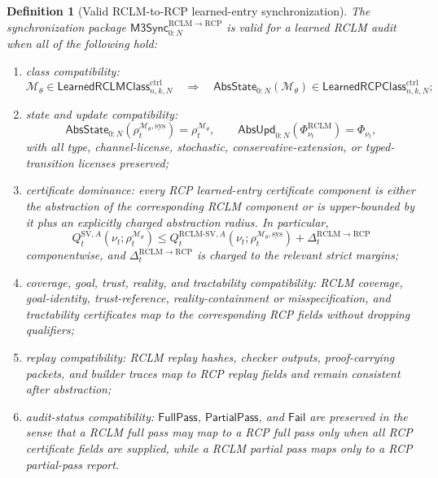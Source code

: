 \documentclass[11pt]{article}
\newtheorem{definition}[theorem]{Definition}
\newcommand{\1}{\mathbf{1}}
\newcommand{\RCP}{\mathrm{RCP}}
\providecommand{\RCLM}{\mathrm{RCLM}}
\providecommand{\sys}{\mathrm{sys}}
\begin{document}
\begin{definition}[Valid RCLM-to-RCP learned-entry synchronization]
\label{def:m3_sync_valid_rclm_to_rcp}
The synchronization package \(\mathsf{M3Sync}_{0:N}^{\RCLM\to\RCP}\) is valid for a learned RCLM audit when all of the following hold:
\begin{enumerate}[label=(\roman*),leftmargin=1.5em]
    \item class compatibility:
    \[
    \mathcal M_\theta\in\mathsf{LearnedRCLMClass}_{n,k,N}^{\mathrm{ctrl}}
    \quad\Longrightarrow\quad
    \mathsf{AbsState}_{0:N}(\mathcal M_\theta)\in\mathsf{LearnedRCPClass}_{n,k,N}^{\mathrm{ctrl}};
    \]
    \item state and update compatibility:
    \[
    \mathsf{AbsState}_{0:N}(\rho_t^{\mathcal M_\theta,\sys})=\rho_t^{\mathcal M_\theta},
    \qquad
    \mathsf{AbsUpd}_{0:N}(\Phi_{\nu_t}^{\RCLM})=\Phi_{\nu_t},
    \]
    with all type, channel-license, stochastic, conservative-extension, or typed-transition licenses preserved;
    \item certificate dominance: every RCP learned-entry certificate component is either the abstraction of the corresponding RCLM component or is upper-bounded by it plus an explicitly charged abstraction radius.  In particular,
    \[
    Q_t^{\mathrm{SV},A}(\nu_t;\rho_t^{\mathcal M_\theta})
    \le
    Q_t^{\RCLM\text{-}\mathrm{SV},A}(\nu_t;\rho_t^{\mathcal M_\theta,\sys})
    +\Delta_t^{\RCLM\to\RCP}
    \]
    componentwise, and \(\Delta_t^{\RCLM\to\RCP}\) is charged to the relevant strict margins;
    \item coverage, goal, trust, reality, and tractability compatibility: RCLM coverage, goal-identity, trust-reference, reality-containment or misspecification, and tractability certificates map to the corresponding RCP fields without dropping qualifiers;
    \item replay compatibility: RCLM replay hashes, checker outputs, proof-carrying packets, and builder traces map to RCP replay fields and remain consistent after abstraction;
    \item audit-status compatibility: \(\mathsf{FullPass}\), \(\mathsf{PartialPass}\), and \(\mathsf{Fail}\) are preserved in the sense that a RCLM full pass may map to a RCP full pass only when all RCP certificate fields are supplied, while a RCLM partial pass maps only to a RCP partial-pass report.
\end{enumerate}
\end{definition}
\end{document}
